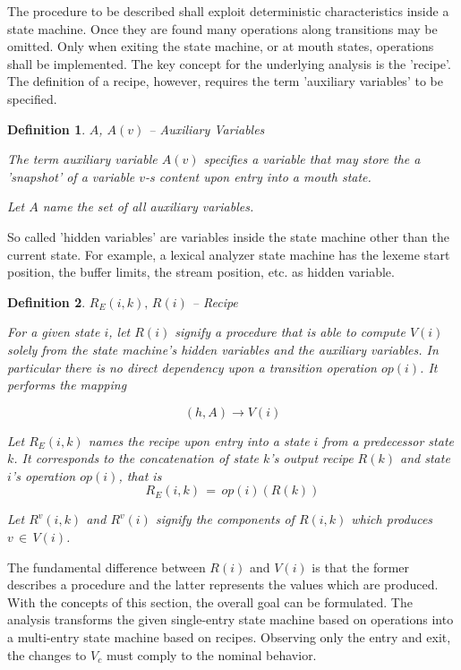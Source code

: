 \documentclass[12pt,a4paper]{scrartcl}
\newtheorem{definition}{Definition}
\begin{document}
The procedure to be described shall exploit deterministic characteristics
inside a state machine. Once they are found many operations along transitions
may be omitted. Only when exiting the state machine, or at mouth states,
operations shall be implemented. The key concept for the underlying
analysis is the 'recipe'. The definition of a recipe, however, requires
the term 'auxiliary variables' to be specified.

\begin{definition} $A$, $A(v)$ -- Auxiliary Variables

The term auxiliary variable $A(v)$ specifies a variable that may store the
a 'snapshot' of a variable $v$-s content upon entry into a mouth state. 
   
Let $A$ name the set of all auxiliary variables.
\end{definition}

So called 'hidden variables' are variables inside the state machine other than
the current state.  For example, a lexical analyzer state machine has the
lexeme start position, the buffer limits, the stream position, etc. as hidden
variable. 

\begin{definition} $R_E(i,k),\,R(i)$ -- Recipe 

For a given state $i$, let $R(i)$ signify a procedure that is able to compute
$V(i)$ solely from the state machine's hidden variables and the auxiliary variables.
In particular there is no direct dependency upon a transition operation $op(i)$.
It performs the mapping

\begin{equation} \label{eq:recipe-procedure}
    (h, A) \rightarrow V(i)                                             
\end{equation}

Let $R_E(i,k)$ names the recipe upon entry into a state $i$ from a predecessor
state $k$. It corresponds to the concatenation of state $k$'s output recipe
$R(k)$ and state $i$'s operation $op(i)$, that is
\begin{equation} \label{eq:entry-recipe-concatenated}
    R_E(i,k) \,=\, op(i)(R(k))
\end{equation}

Let $R^v(i,k)$ and $R^v(i)$ signify the components of $R(i,k)$ which produces
$v\,\in\,V(i)$.  
\end{definition}

The fundamental difference between $R(i)$ and $V(i)$ is that the former
describes a procedure and the latter represents the values which are produced.
With the concepts of this section, the overall goal can be formulated. The
analysis transforms the given single-entry state machine based on operations
into a multi-entry state machine based on recipes. Observing only the entry and
exit, the changes to $V_c$ must comply to the nominal behavior. 
\end{document}
